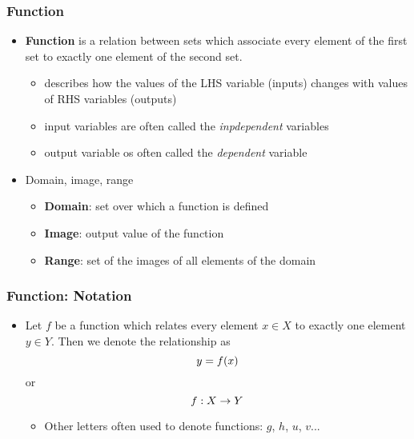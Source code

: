 \documentclass[pdflatex, 12pt]{beamer}
\begin{document}
\begin{frame}
\frametitle{Function}
\begin{itemize}
\item \textbf{Function} is a relation between sets which associate every element of the first set to exactly one element of the second set.
 \begin{itemize}
 \item describes how the values of the LHS variable (inputs) changes with values of RHS variables (outputs)
 \item input variables are often called the \emph{inpdependent} variables
 \item output variable os often called the \emph{dependent} variable
 \end{itemize}
\vspace{0.4cm}
\item Domain, image, range
 \begin{itemize}
 \item \textbf{Domain}: set over which a function is defined
 \item \textbf{Image}: output value of the function 
 \item \textbf{Range}: set of the images of all elements of the domain
 \end{itemize}
\end{itemize}
\end{frame}

\begin{frame}
\frametitle{Function: Notation}
\begin{itemize}
\item Let $f$ be a function which relates every element $x \in X$ to exactly one element $y \in Y$. Then we denote the relationship as
\begin{equation}
y = f(x) \notag
\end{equation}
or 
\begin{equation}
f: X \rightarrow Y \notag
\end{equation}
 \begin{itemize}
 \item Other letters often used to denote functions: $g$, $h$, $u$, $v$...
 \end{itemize}
\end{itemize}
\end{frame}
\end{document}
